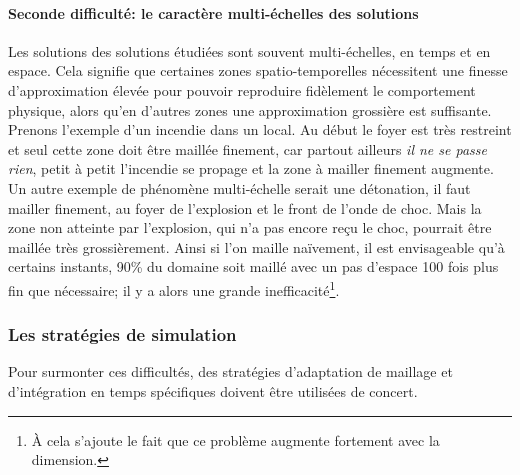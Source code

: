     \paragraph{Seconde difficulté: le caractère multi-échelles des solutions}
        Les solutions des solutions étudiées sont souvent multi-échelles, en temps et en espace. Cela signifie que certaines zones spatio-temporelles nécessitent
        une finesse d'approximation élevée pour pouvoir reproduire fidèlement le comportement physique, alors qu'en d'autres zones une approximation
        grossière est suffisante. Prenons l'exemple d'un incendie dans un local. Au début le foyer est très restreint et seul cette zone doit être maillée finement, 
        car partout ailleurs \textit{il ne se passe rien}, petit à petit l'incendie se propage et la zone à mailler finement augmente. Un autre exemple de phénomène 
        multi-échelle serait une détonation, il faut mailler finement, au foyer de l'explosion et le front de l'onde de choc. Mais la zone non atteinte par l'explosion, 
        qui n'a pas encore reçu le choc, pourrait être maillée très grossièrement. 
        Ainsi si l'on maille naïvement, il est envisageable qu'à certains instants, 90\% du domaine soit maillé avec un pas d'espace 100 fois plus fin que nécessaire;
        il y a alors une grande inefficacité\footnote{À cela s'ajoute le fait que ce problème augmente fortement avec la dimension.}.


\subsubsection{Les stratégies de simulation}
    Pour surmonter ces difficultés, des stratégies d'adaptation de maillage et d'intégration en temps spécifiques doivent être utilisées de concert. 
